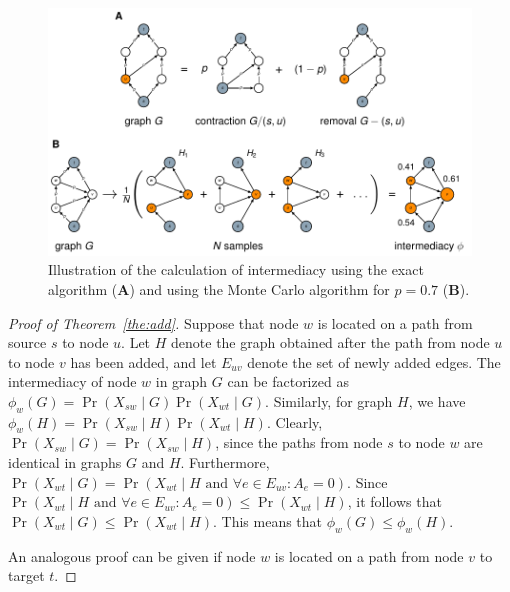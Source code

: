 \documentclass[9pt,twocolumn,twoside]{pnas-alt} %
\theoremstyle{definition}
\newcommand{\theref}[1]{Theorem~\ref{the:#1}\xspace}
\begin{document}
{\begin{sansmath}\begin{figure}
    \centering%
    \includegraphics[width=11.4cm]{algorithms}
    \caption{Illustration of the calculation of intermediacy using the exact algorithm (\textbf{A}) and using the Monte Carlo algorithm for $p = 0.7$ (\textbf{B}).}
    \label{fig:algorithms}
\end{figure}\end{sansmath}

\begin{proof}[Proof of \theref{add}]
    Suppose that node $w$ is located on a path from source $s$ to node $u$. Let $H$ denote the graph obtained after the path from node $u$ to node $v$ has been added, and let $E_{uv}$ denote the set of newly added edges. The intermediacy of node $w$ in graph $G$ can be factorized as $\phi_w(G) = \Pr(X_{sw} \mid G)\Pr(X_{wt} \mid G)$. Similarly, for graph $H$, we have $\phi_w(H) = \Pr(X_{sw} \mid H)\Pr(X_{wt} \mid H)$. Clearly, $\Pr(X_{sw} \mid G) = \Pr(X_{sw} \mid H)$, since the paths from node $s$ to node $w$ are identical in graphs $G$ and $H$. Furthermore, $\Pr(X_{wt} \mid G) = \Pr(X_{wt} \mid H \text{~and~} \forall e \in E_{uv}\!:\!A_e = 0)$. Since $\Pr(X_{wt} \mid H \text{~and~} \forall e \in E_{uv}\!:\!A_e = 0) \leq \Pr(X_{wt} \mid H)$, it follows that $\Pr(X_{wt} \mid G) \leq \Pr(X_{wt} \mid H)$. This means that $\phi_w(G) \leq \phi_w(H)$.

    An analogous proof can be given if node $w$ is located on a path from node $v$ to target $t$.
\end{proof}

}
\end{document}
